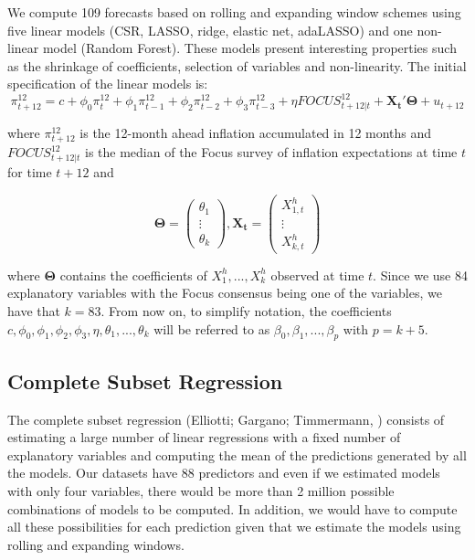 \documentclass[12pt,openright,twoside,a4paper,brazil,english,emptypage,openany]{abntex2}
\begin{document}
\hspace{1em} We compute 109 forecasts based on rolling and expanding window schemes using five linear models (CSR, LASSO, ridge, elastic net, adaLASSO) and one non-linear model (Random Forest). These models present interesting properties such as the shrinkage of coefficients, selection of variables and non-linearity. The initial specification of the linear models is:
$$\pi_{t+12}^{12} = c + \phi_0 \pi_t^{12} + \phi_1 \pi_{t-1}^{12} + \phi_2 \pi_{t-2}^{12} +\phi_3 \pi_{t-3}^{12} + \eta FOCUS_{t+12|t}^{12} + \mathbf{X_t ' \Theta} + u_{t+12}$$

\hspace{-1.7em} where  $\pi_{t+12}^{12}$ is the 12-month ahead inflation accumulated in 12 months and $FOCUS_{t+12|t}^{12}$ is the median of the Focus survey of inflation expectations at time $t$ for time $t+12$ and

\[
\mathbf{\Theta} = \begin{pmatrix}
    \theta_1 \\
    \vdots \\
    \theta_k
\end{pmatrix},
\mathbf{X_t} = \begin{pmatrix}
    X_{1,t}^h \\
    \vdots \\
    X_{k,t}^h
\end{pmatrix}
\]

\hspace{-1.7em} where $\mathbf{\Theta}$ contains the coefficients of $X_1^h,...,X_k^h$ observed at time $t$. Since we use 84 explanatory variables with the Focus consensus being one of the variables, we have that $k=83$. From now on, to simplify notation, the coefficients $c,\phi_0, \phi_1, \phi_2, \phi_3, \eta, \theta_1,...,\theta_k$ will be referred to as $\beta_0,\beta_1, ...,\beta_p$ with $p = k+5$.

\subsection{Complete Subset Regression}

\hspace{1em} The complete subset regression (Elliotti; Gargano; Timmermann, 
\citeyear{elliott2013complete}) consists of estimating a large number of linear regressions with a fixed number of explanatory variables and computing the mean of the predictions generated by all the models. Our datasets have 88 predictors and even if we estimated models with only four variables, there would be more than 2 million possible combinations of models to be computed. In addition, we would have to compute all these possibilities for each prediction given that we estimate the models using rolling and expanding windows. 
\end{document}
